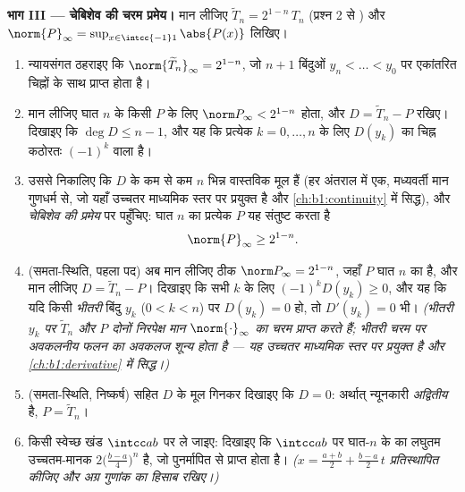 \begin{problem}
\medskip \noindent\textbf{भाग III --- चेबिशेव की चरम प्रमेय।} मान लीजिए
$\widetilde T_n = 2^{1-n}\,T_n$ (प्रश्न 2 से ) और $\norm{P}_\infty
= \sup_{x \in \intcc{-1}1}\abs{P(x)}$ लिखिए।
\begin{enumerate}[resume]
  \item न्यायसंगत ठहराइए कि $\norm{\widetilde T_n}_\infty = 2^{1-n}$, जो $n
  + 1$ बिंदुओं $y_n < \dots < y_0$ पर एकांतरित चिह्नों के साथ प्राप्त होता
  है।
  \item मान लीजिए घात $n$ के किसी  $P$ के लिए $\norm P_\infty <
  2^{1-n}$ होता, और $D = \widetilde T_n - P$ रखिए। दिखाइए कि $\deg D \leq n
  - 1$, और यह कि प्रत्येक $k = 0, \dots, n$ के लिए $D(y_k)$ का चिह्न कठोरतः
  $(-1)^k$ वाला है।
  \item उससे निकालिए कि $D$ के कम से कम $n$ भिन्न वास्तविक मूल हैं (हर
  अंतराल में एक, मध्यवर्ती मान गुणधर्म से, जो यहाँ उच्चतर माध्यमिक स्तर पर
  प्रयुक्त है और \cref{ch:b1:continuity} में सिद्ध), और \emph{चेबिशेव की
  प्रमेय} पर पहुँचिए: घात $n$ का प्रत्येक  $P$ यह संतुष्ट करता है
        \[
        \norm{P}_\infty \geq 2^{1-n} .
        \]
  \item (समता-स्थिति, पहला पद) अब मान लीजिए ठीक $\norm P_\infty = 2^{1-n}$,
  जहाँ $P$ घात $n$ का  है, और मान लीजिए $D = \widetilde T_n - P$।
  दिखाइए कि सभी $k$ के लिए $(-1)^kD(y_k) \geq 0$, और यह कि यदि किसी
  \emph{भीतरी} बिंदु $y_k$ ($0 < k < n$) पर $D(y_k) = 0$ हो, तो $D'(y_k) =
  0$ भी। \emph{(भीतरी $y_k$ पर $\widetilde T_n$ और $P$ दोनों निरपेक्ष मान
  $\norm{\cdot} _\infty$ का चरम प्राप्त करते हैं; भीतरी चरम पर अवकलनीय फलन
  का अवकलज शून्य होता है --- यह उच्चतर माध्यमिक स्तर पर प्रयुक्त है और
  \cref{ch:b1:derivative} में सिद्ध।)}
  \item (समता-स्थिति, निष्कर्ष)  सहित $D$ के मूल गिनकर दिखाइए कि $D =
  0$: अर्थात् न्यूनकारी \emph{अद्वितीय} है, $P = \widetilde T_n$।
  \item किसी स्वेच्छ खंड $\intcc ab$ पर ले जाइए: दिखाइए कि $\intcc ab$ पर
  घात-$n$ के  का लघुतम उच्चतम-मानक
  $2\bigl(\frac{b-a}4\bigr)^n$ है, जो पुनर्मापित  से प्राप्त
  होता है। \emph{($x = \frac{a+b}2 + \frac{b-a}2\,t$ प्रतिस्थापित कीजिए और
  अग्र गुणांक का हिसाब रखिए।)}
\end{enumerate}


\end{problem}
